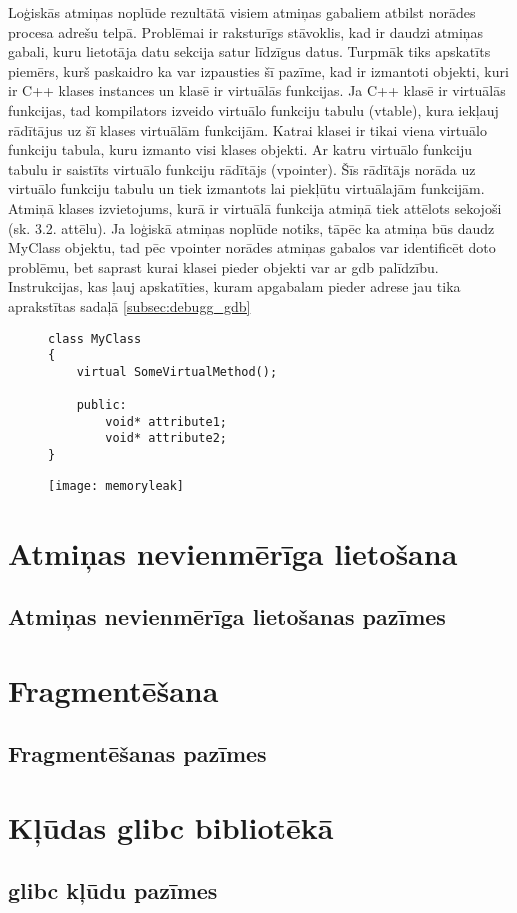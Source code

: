 Loģiskās atmiņas noplūde rezultātā visiem atmiņas gabaliem atbilst norādes procesa adrešu telpā. 
Problēmai ir raksturīgs stāvoklis, kad ir daudzi atmiņas gabali, kuru lietotāja datu sekcija satur līdzīgus datus.
Turpmāk tiks apskatīts piemērs, kurš paskaidro ka var izpausties šī pazīme, kad ir izmantoti objekti, kuri ir  C++ klases instances un klasē ir virtuālās funkcijas.
Ja C++ klasē ir virtuālās funkcijas, tad kompilators izveido virtuālo funkciju tabulu (vtable), kura iekļauj rādītājus uz šī klases virtuālām funkcijām.
 Katrai klasei ir tikai viena virtuālo funkciju tabula, kuru izmanto visi klases objekti.
 Ar katru virtuālo funkciju tabulu ir saistīts virtuālo funkciju rādītājs (vpointer).
 Šīs rādītājs norāda uz virtuālo funkciju tabulu un tiek izmantots lai piekļūtu virtuālajām funkcijām.
Atmiņā klases izvietojums, kurā ir virtuālā funkcija atmiņā tiek attēlots sekojoši (sk. 3.2. attēlu).
Ja loģiskā atmiņas noplūde notiks, tāpēc ka atmiņa būs daudz  MyClass objektu, tad pēc vpointer norādes atmiņas gabalos var identificēt doto problēmu, bet saprast kurai klasei pieder objekti var ar gdb palīdzību.
Instrukcijas, kas ļauj apskatīties, kuram apgabalam pieder adrese jau tika aprakstītas sadaļā \ref{subsec:debugg_gdb}
\begin{figure}[h]
\begin{lstlisting}
class MyClass
{
    virtual SomeVirtualMethod();
    
    public:
        void* attribute1;
        void* attribute2;
}
\end{lstlisting}
\end{figure}
\begin{figure}[h]
\begin{center}
\texttt{[image: memoryleak]}
\end{center}
\caption{\textbf{\fontsize{11}{12}\selectfont {C++ klases ar virtuālo funkciju izvietojums atmiņā }}}
\label{fig:memoryleak}
\end{figure}



\section{Atmiņas nevienmērīga lietošana}
\subsection{Atmiņas nevienmērīga lietošanas pazīmes}

\section{Fragmentēšana}
\subsection{Fragmentēšanas pazīmes}

\section{Kļūdas glibc bibliotēkā}
\subsection{glibc kļūdu pazīmes}
